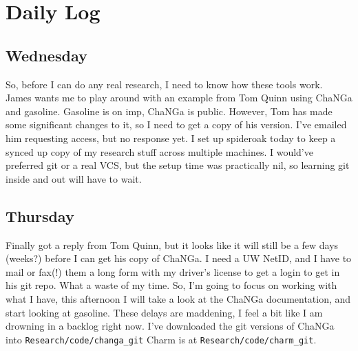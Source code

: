 \documentclass[11pt,letterpaper]{article}
\begin{document}
\section{Daily Log}

\subsection{Wednesday}

So, before I can do any real research, I need to know how these tools
work.\\James wants me to play around with an example from Tom Quinn
using ChaNGa and gasoline. Gasoline is on imp, ChaNGa is public.
However, Tom has made some significant changes to it, so I need to get a
copy of his version. I've emailed him requesting access, but no response
yet. I set up spideroak today to keep a synced up copy of my research
stuff across multiple machines. I would've preferred git or a real VCS,
but the setup time was practically nil, so learning git inside and out
will have to wait.

\subsection{Thursday}

Finally got a reply from Tom Quinn, but it looks like it will still be a
few days (weeks?) before I can get his copy of ChaNGa. I need a UW
NetID, and I have to mail or fax(!) them a long form with my driver's
license to get a login to get in his git repo. What a waste of my time.
So, I'm going to focus on working with what I have, this afternoon I
will take a look at the ChaNGa documentation, and start looking at
gasoline. These delays are maddening, I feel a bit like I am drowning in
a backlog right now. I've downloaded the git versions of ChaNGa into
\verb!Research/code/changa_git! Charm is at
\verb!Research/code/charm_git!.
\end{document}
